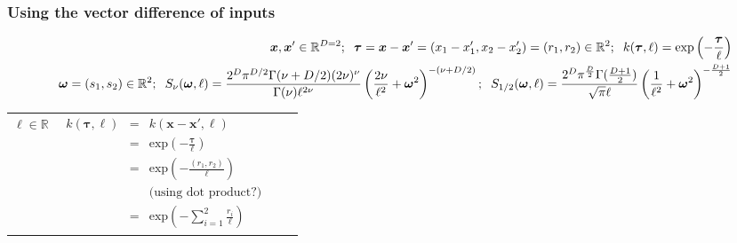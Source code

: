 \documentclass[]{interact}
\theoremstyle{plain}%
\theoremstyle{definition}
\theoremstyle{remark}
\begin{document}
\begin{landscape}
\begin{table}[H]
\begin{center}
\begin{tabular}{|c|c|c|c|}
       & \multicolumn{1}{|p{6.7cm}|}{\small

       } \\ 
       
       \hline
    \end{tabular}
  \end{center}
\end{table}


\newpage
\subsubsection{Using  the vector difference of inputs}
\vspace{-5mm}

\begin{table}[H]
\small
\begin{eqnarray*}
\vspace{-20mm}
&&\bm{x}, \bm{x}' \in \mathbb{R}^{D=2}; \hspace{2mm}\bm{\tau} =\bm{x}-\bm{x}' = (x_1-x_1',x_2-x_2') = (r_1,r_2) \in \mathbb{R}^2; \hspace{2mm} k(\bm{\tau},\ell) = \mathrm{exp}\left(- \frac{\bm{\tau}}{\ell} \right)\\
&& \bm{\omega}= (s_1,s_2) \in \mathbb{R}^2; \hspace{2mm}S_{\nu}(\bm{\omega},\ell) = \frac{2^D\pi^{D/2}\Gamma(\nu+D/2)(2\nu)^{\nu}}{\Gamma(\nu)\ell^{2\nu}}\left(\frac{2\nu}{\ell^2}+\bm{\omega}^2 \right)^{-(\nu+D/2)}; \hspace{2mm} S_{1/2}(\bm{\omega},\ell) = \frac{2^D\pi^{\frac{D}{2}}\Gamma(\frac{D+1}{2})}{\sqrt{\pi}\ell}\left(\frac{1}{\ell^2}+\bm{\omega}^2 \right)^{-\frac{D+1}{2}}
\end{eqnarray*}
\normalsize
  \begin{center}
    \begin{tabular}{|c|c|c|c|}
       \hline
       
       \multicolumn{1}{|p{1.5cm}|}{
       \vspace{1mm}
       $\ell \in \mathbb{R}$
       }
       
        & \multicolumn{1}{|p{5.7cm}|}{\small
         \begin{eqnarray*}
		k(\bm{\tau},\ell) &=& k(\bm{x}-\bm{x}',\ell)\\
		 &=& \mathrm{exp}\left(- \frac{\bm{\tau}}{\ell} \right) \\
		&=& \mathrm{exp}\left(- \frac{(r_1, r_2)}{\ell} \right)\\
		&&\text{(using dot product?)}\\
		&=& \mathrm{exp}\left(- \sum_{i=1}^{2}\frac{r_i}{\ell} \right)
		\end{eqnarray*}
       }
       

\end{tabular}
\end{center}
\end{table}
\end{landscape}
\end{document}
